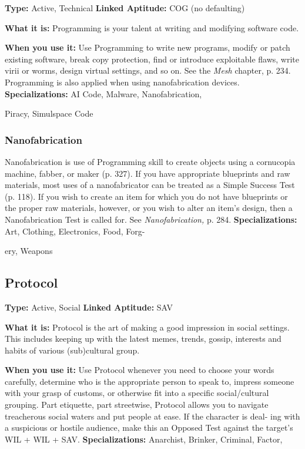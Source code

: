 \textbf{Type:} Active, Technical
\textbf{Linked Aptitude:} COG (no defaulting)

\textbf{What it is:} Programming is your talent at writing 
and modifying software code.

\textbf{When you use it:} Use Programming to write new 
programs, modify or patch existing software, break 
copy protection, find or introduce exploitable flaws, 
write virii or worms, design virtual settings, and so 
on. See the \textit{Mesh} chapter, p. 234. Programming is also 
applied when using nanofabrication devices.
\textbf{Specializations:} AI Code, Malware, Nanofabrication, 

Piracy, Simulspace Code

\subsubsection{Nanofabrication}

Nanofabrication is use of Programming skill to create 
objects using a cornucopia machine, fabber, or maker 
(p. 327). If you have appropriate blueprints and raw 
materials, most uses of a nanofabricator can be treated 
as a Simple Success Test (p. 118). If you wish to create 
an item for which you do not have blueprints or the 
proper raw materials, however, or you wish to alter an 
item's design, then a Nanofabrication Test is called for. 
See \textit{Nanofabrication,} p. 284.
\textbf{Specializations:} Art, Clothing, Electronics, Food, Forg-

ery, Weapons

\subsection{Protocol}

\textbf{Type:} Active, Social
\textbf{Linked Aptitude:} SAV

\textbf{What it is:} Protocol is the art of making a good 
impression in social settings. This includes keeping 
up with the latest memes, trends, gossip, interests and 
habits of various (sub)cultural group.

\textbf{When you use it:} Use Protocol whenever you need 
to choose your words carefully, determine who is the 
appropriate person to speak to, impress someone with 
your grasp of customs, or otherwise fit into a specific 
social/cultural grouping. Part etiquette, part streetwise, 
Protocol allows you to navigate treacherous social 
waters and put people at ease. If the character is deal-
ing with a suspicious or hostile audience, make this an 
Opposed Test against the target's WIL + WIL + SAV.
\textbf{Specializations:} Anarchist, Brinker, Criminal, Factor, 

